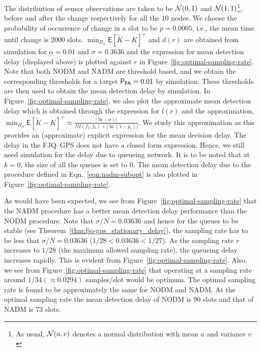 \documentclass[acmtosn]{acmtrans2m}
\newcommand{\EXP}[1]{\mathsf{E}\!\left[#1\right]}
\begin{document}
The distribution of sensor observations are taken to be ${\cal{N}}(0,1)$ and 
${\cal{N}}(1,1)$\footnote{As usual, ${\cal{N}}(a,v)$ denotes a normal 
distribution with mean $a$ and variance $v$}, before and after the change 
respectively for all the $10$ nodes. We choose the probability of occurrence 
of change in a slot to be $p=0.0005$, i.e., the mean time until change is 
$2000$ slots. $\min_{\Pi_\alpha}\EXP{\widetilde{K}-K}^+$ and $d(r)$ are obtained 
from simulation for $\alpha=0.01$ and $\sigma=0.3636$ and the expression for mean 
detection delay (displayed above) is plotted against $r$ 
in Figure~\ref{fig:optimal-sampling-rate}. Note that both NODM and NADM
are threshold based, and we obtain the corresponding thresholds for 
a target ${\sf P_{FA}} = 0.01$ by simulation. These thresholds are then used
to obtain the mean detection delay by simulation. 
In Figure~\ref{fig:optimal-sampling-rate}, 
we also plot the approximate mean detection delay which is obtained through the 
expression for $l(r)$ and the approximation,
$\min_{\Pi_\alpha} \EXP{\widetilde{K}-K}^+ \approx \frac{|\ln(\alpha)|}{NI(f_1,f_0)+|\ln(1-p_r)|}$. 
We study this approximation as this provides an (approximate) explicit expression 
for the mean decision delay. The delay in the FJQ--GPS does not have a closed form 
expression. Hence, we still need simulation for the delay due to queueing network.
It is to be noted that
at $k=0$, the size of all the queues is set to 0. 
The mean detection delay due to the procedure defined in Eqn.~\ref{eqn:nadm-subopt}
is also plotted in Figure~\ref{fig:optimal-sampling-rate}. 

As would have been expected, we see from Figure~\ref{fig:optimal-sampling-rate} 
that the {\sf NADM} procedure has a better mean detection delay performance than 
the {\sf NODM} procedure. Note that $\sigma/N = 0.03636$ and hence for the queues 
to be stable (see Theorem~\ref{thm:fjq-gps_stationary_delay}), the sampling rate
has to be less that $\sigma/N = 0.03636$ ($1/28 < 0.03636 < 1/27$). As the sampling 
rate $r$ increases to 1/28 (the maximum allowed sampling rate), the queueing delay 
increases rapidly. This is evident from Figure~\ref{fig:optimal-sampling-rate}. Also, 
we see from Figure~\ref{fig:optimal-sampling-rate} that operating at a sampling rate 
around $1/34 (\approx 0.0294)$ samples/slot would be optimum. The optimal sampling 
rate is found to be approximately the same for {\sf NODM} and {\sf NADM}. At the 
optimal sampling rate the mean detection delay of {\sf NODM} is 90 slots and that 
of {\sf NADM} is 73 slots.
\end{document}
